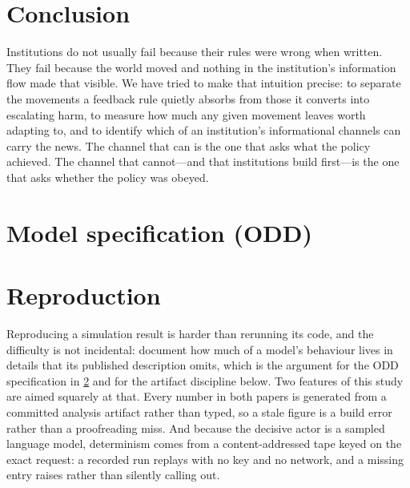 \documentclass[11pt]{article}
\begin{document}
\section{Conclusion}

Institutions do not usually fail because their rules were wrong when written. They fail because the
world moved and nothing in the institution's information flow made that visible. We have tried to
make that intuition precise: to separate the movements a feedback rule quietly absorbs from those it
converts into escalating harm, to measure how much any given movement leaves worth adapting to, and
to identify which of an institution's informational channels can carry the news. The channel that
can is the one that asks what the policy achieved. The channel that cannot---and that institutions
build first---is the one that asks whether the policy was obeyed.

\appendix
\section{Model specification (ODD)}
\label{app:odd}


\section{Reproduction}
\label{app:repro-social}

\noindent Reproducing a simulation result is harder than rerunning its code, and the difficulty is
not incidental: \citet{edmonds2003replication} document how much of a model's behaviour lives in
details that its published description omits, which is the argument for the ODD specification in
\cref{app:odd} and for the artifact discipline below. Two features of this study are aimed squarely
at that. Every number in both papers is generated from a committed analysis artifact rather than
typed, so a stale figure is a build error rather than a proofreading miss. And because the decisive
actor is a sampled language model, determinism comes from a content-addressed tape keyed on the exact
request: a recorded run replays with no key and no network, and a missing entry raises rather than
silently calling out.





\end{document}
